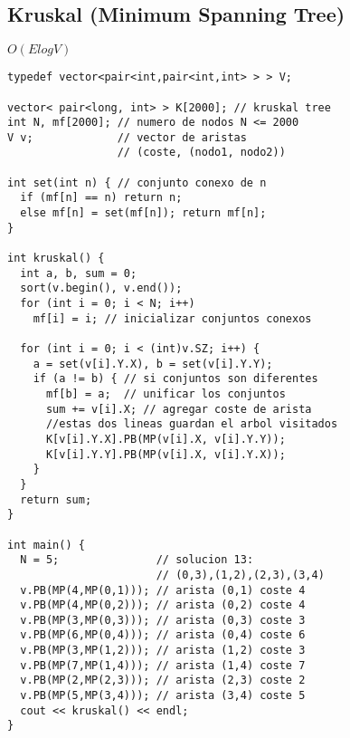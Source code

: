 \documentclass[10pt, a4, oneside]{article}
\begin{document}
\subsection{Kruskal (Minimum Spanning Tree)}
$O(E log V)$
\begin{verbatim}
typedef vector<pair<int,pair<int,int> > > V;

vector< pair<long, int> > K[2000]; // kruskal tree
int N, mf[2000]; // numero de nodos N <= 2000
V v;             // vector de aristas
                 // (coste, (nodo1, nodo2))

int set(int n) { // conjunto conexo de n
  if (mf[n] == n) return n;
  else mf[n] = set(mf[n]); return mf[n];
}

int kruskal() {
  int a, b, sum = 0;
  sort(v.begin(), v.end());
  for (int i = 0; i < N; i++)
    mf[i] = i; // inicializar conjuntos conexos

  for (int i = 0; i < (int)v.SZ; i++) {
    a = set(v[i].Y.X), b = set(v[i].Y.Y);
    if (a != b) { // si conjuntos son diferentes
      mf[b] = a;  // unificar los conjuntos
      sum += v[i].X; // agregar coste de arista
      //estas dos lineas guardan el arbol visitados
      K[v[i].Y.X].PB(MP(v[i].X, v[i].Y.Y));
      K[v[i].Y.Y].PB(MP(v[i].X, v[i].Y.X));
    }
  }
  return sum;
}

int main() {
  N = 5;               // solucion 13:
                       // (0,3),(1,2),(2,3),(3,4)
  v.PB(MP(4,MP(0,1))); // arista (0,1) coste 4
  v.PB(MP(4,MP(0,2))); // arista (0,2) coste 4
  v.PB(MP(3,MP(0,3))); // arista (0,3) coste 3
  v.PB(MP(6,MP(0,4))); // arista (0,4) coste 6
  v.PB(MP(3,MP(1,2))); // arista (1,2) coste 3
  v.PB(MP(7,MP(1,4))); // arista (1,4) coste 7
  v.PB(MP(2,MP(2,3))); // arista (2,3) coste 2
  v.PB(MP(5,MP(3,4))); // arista (3,4) coste 5
  cout << kruskal() << endl;
}
\end{verbatim}
\end{document}

